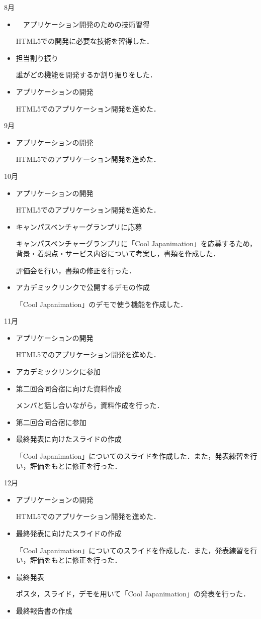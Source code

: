 8月
\begin{itemize}
\item　アプリケーション開発のための技術習得
\par HTML5での開発に必要な技術を習得した．
\item 担当割り振り
\par 誰がどの機能を開発するか割り振りをした．
\item アプリケーションの開発
\par HTML5でのアプリケーション開発を進めた．
\end{itemize}
9月
\begin{itemize}
\item アプリケーションの開発
\par HTML5でのアプリケーション開発を進めた．
\end{itemize}
10月
\begin{itemize}
\item アプリケーションの開発
\par HTML5でのアプリケーション開発を進めた．
\item キャンパスベンチャーグランプリに応募
\par キャンパスベンチャーグランプリに「Cool Japanimation」を応募するため，背景・着想点・サービス内容について考案し，書類を作成した．
\par 評価会を行い，書類の修正を行った．
\item アカデミックリンクで公開するデモの作成
\par 「Cool Japanimation」のデモで使う機能を作成した．
\end{itemize}
11月
\begin{itemize}
\item アプリケーションの開発
\par HTML5でのアプリケーション開発を進めた．
\item アカデミックリンクに参加
\item 第二回合同合宿に向けた資料作成
\par メンバと話し合いながら，資料作成を行った．
\item 第二回合同合宿に参加
\item 最終発表に向けたスライドの作成
\par 「Cool Japanimation」についてのスライドを作成した．また，発表練習を行い，評価をもとに修正を行った．
\end{itemize}
12月
\begin{itemize}
\item アプリケーションの開発
\par HTML5でのアプリケーション開発を進めた．
\item 最終発表に向けたスライドの作成
\par 「Cool Japanimation」についてのスライドを作成した．また，発表練習を行い，評価をもとに修正を行った．
\item 最終発表
\par ポスタ，スライド，デモを用いて「Cool Japanimation」の発表を行った．
\item 最終報告書の作成
\end{itemize}
